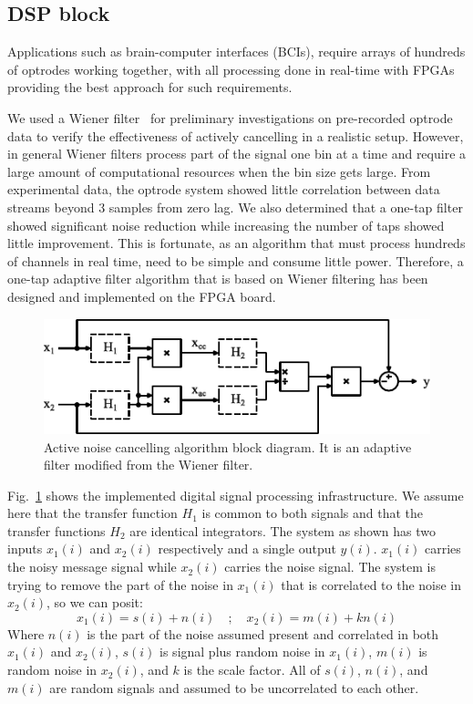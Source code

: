 \subsection{DSP block}



Applications such as brain-computer interfaces (BCIs), require arrays of hundreds of optrodes working together, with all processing done in real-time with FPGAs providing the best approach for such requirements.

We used a Wiener filter~\cite{WienerFilter} for preliminary investigations on pre-recorded optrode data to verify the effectiveness of actively cancelling in a realistic setup. However, in general Wiener filters process part of the signal one bin at a time and require a large amount of computational resources when the bin size gets large.  From experimental data, the optrode system showed little correlation between data streams beyond 3 samples from zero lag. We also determined that a one-tap filter showed significant noise reduction while increasing the number of taps showed little improvement.  This is fortunate, as an algorithm that must process hundreds of channels in real time, need to be simple and consume little power.  Therefore, a one-tap adaptive filter algorithm that is based on Wiener filtering has been designed and implemented on the FPGA board.

\begin{figure}[h]
\centerline{\includegraphics[width=1\linewidth]{4-ANC_Sys/DSP.pdf}}
\caption{Active noise cancelling algorithm block diagram.  It is an adaptive filter modified from the Wiener filter.}
\label{fig_DSP}
\end{figure}

Fig.~\ref{fig_DSP} shows the implemented digital signal processing infrastructure.  We assume here that the transfer function $H_1$ is common to both signals and that the transfer functions $H_2$ are identical integrators.  The system as shown has two inputs $x_1(i)$ and $x_2(i)$ respectively and a single output $y(i)$.  $x_1(i)$ carries the noisy message signal while $x_2(i)$ carries the noise signal.  The system is trying to remove the part of the noise in $x_1(i)$ that is correlated to the noise in $x_2(i)$, so we can posit:
$$x_1(i)=s(i)+n(i) \quad;\quad x_2(i)=m(i)+kn(i)$$
Where $n(i)$ is the part of the noise assumed present and correlated in both $x_1(i)$ and $x_2(i)$, $s(i)$ is signal plus random noise in $x_1(i)$, $m(i)$ is random noise in $x_2(i)$, and $k$ is the scale factor.  All of $s(i)$, $n(i)$, and $m(i)$ are random signals and assumed to be uncorrelated to each other.

